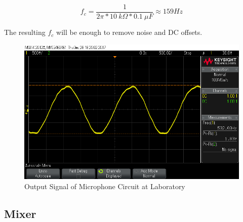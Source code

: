 \documentclass[paper]{IEEEtran}
\begin{document}
$$ f_{c} =\frac{1}{2\pi*10~k\Omega*0.1~\mu F}\approx 159 Hz $$

The resulting $f_c$ will be enough to remove noise and DC offsets.

\begin{figure}[h!]
\setlength{\unitlength}{\textwidth}
\center 
\includegraphics[width=0.45\unitlength]{mic_osc.png}
\caption{\label{fig:micout} Output Signal of Microphone Circuit at Laboratory }
\end{figure}	





	
	
\subsection{Mixer}
	
\end{document}
